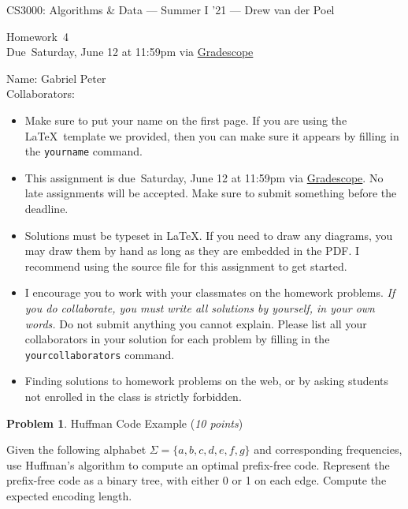 \documentclass[11pt]{article}
\newcommand{\yourname}{Gabriel Peter}
\newcommand{\yourcollaborators}{}
\theoremstyle{definition}
\newcommand{\instructor}{Drew van der Poel}
\newcommand{\hwnum}{4}
\newcommand{\hwdue}{Saturday, June 12 at 11:59pm via \href{https://gradescope.com/courses/266585}{Gradescope}}
\theoremstyle{theorem}
\newtheorem{prob}{Problem}
\begin{document}
{\Large 
\begin{center}{CS3000: Algorithms \& Data} --- Summer I '21 --- \instructor \end{center}}
{\large
\vspace{10pt}
\noindent Homework~\hwnum \vspace{2pt}\\
Due~\hwdue}

\bigskip
{\large
\noindent Name: \yourname \vspace{2pt}\\ Collaborators: \yourcollaborators}

\vspace{15pt}
\begin{itemize}

\item Make sure to put your name on the first page.  If you are using the \LaTeX~template we provided, then you can make sure it appears by filling in the \texttt{yourname} command.

\item This assignment is due~\hwdue.  No late assignments will be accepted.  Make sure to submit something before the deadline.

\item Solutions must be typeset in \LaTeX.  If you need to draw any diagrams, you may draw them by hand as long as they are embedded in the PDF.  I recommend using the source file for this assignment to get started.

\item I encourage you to work with your classmates on the homework problems. \emph{If you do collaborate, you must write all solutions by yourself, in your own words.}  Do not submit anything you cannot explain.  Please list all your collaborators in your solution for each problem by filling in the \texttt{yourcollaborators} command.

\item Finding solutions to homework problems on the web, or by asking students not enrolled in the class is strictly forbidden.

\end{itemize}

\newpage



\begin{prob} Huffman Code Example (\emph{10 points})\end{prob}

Given the following alphabet $\Sigma=\{a,b,c,d,e,f,g\}$ and corresponding frequencies, use Huffman's algorithm to compute an optimal prefix-free code. Represent the prefix-free code as a binary tree, with either 0 or 1 on each edge. Compute the expected encoding length.
\end{document}
